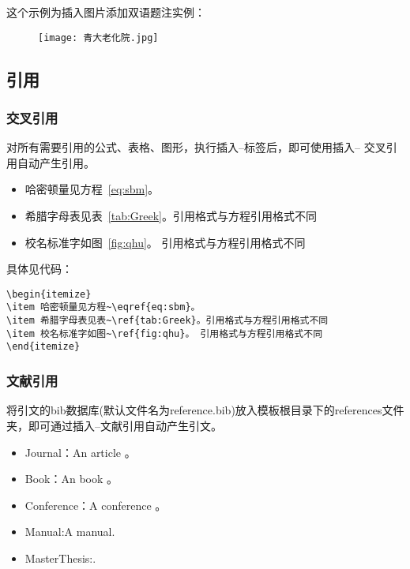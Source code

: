这个示例为插入图片添加双语题注实例：
\begin{figure}[H]
	\centering
	\texttt{[image: 青大老化院.jpg]}  %
\end{figure}

\subsection{引用}
\subsubsection{交叉引用}
对所有需要引用的公式、表格、图形，执行插入--标签后，即可使用插入-- 交叉引用自动产生引用。
\begin{itemize}
\item 哈密顿量见方程~\eqref{eq:sbm}。
\item 希腊字母表见表~\ref{tab:Greek}。引用格式与方程引用格式不同
\item 校名标准字如图~\ref{fig:qhu}。 引用格式与方程引用格式不同
\end{itemize}
具体见代码：
\begin{verbatim}
\begin{itemize}
\item 哈密顿量见方程~\eqref{eq:sbm}。
\item 希腊字母表见表~\ref{tab:Greek}。引用格式与方程引用格式不同
\item 校名标准字如图~\ref{fig:qhu}。 引用格式与方程引用格式不同
\end{itemize}
\end{verbatim}
\subsubsection{文献引用}
将引文的bib数据库(默认文件名为reference.bib)放入模板根目录下的references文件夹，即可通过插入--文献引用自动产生引文。
\begin{itemize}
\item Journal：An article \cite{ELIDRISSI94,MELLINGER96,SHELL02,cnarticle}。
\item Book：An book \cite{IEEE-1363,tex,companion}。
\item Conference：A conference \cite{kocher99,DPMG,cnproceed}。
\item Manual:A manual\cite{NPB2}.
\item MasterThesis:\cite{zhubajie,metamori2004,shaheshang,FistSystem01}.
\end{itemize}
